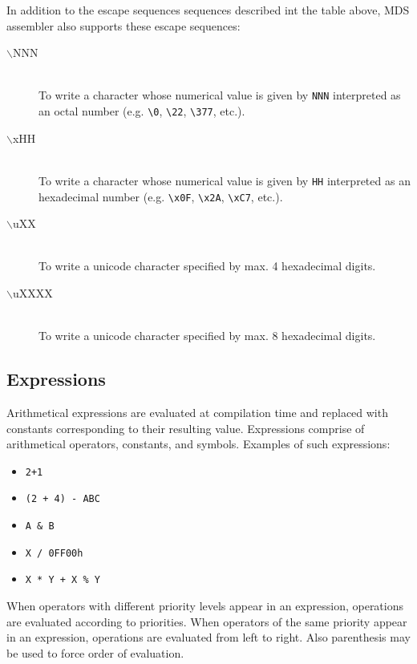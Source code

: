             In addition to the escape sequences sequences described int the table above, MDS assembler also supports these escape sequences:
            \begin{description}
                \item[$\backslash$NNN]~\\
                    To write a character whose numerical value is given by \texttt{NNN} interpreted as an octal number (e.g. \verb'\0', \verb'\22', \verb'\377', etc.).
                \item[$\backslash$xHH]~\\
                    To write a character whose numerical value is given by \texttt{HH} interpreted as an hexadecimal number (e.g. \verb'\x0F', \verb'\x2A', \verb'\xC7', etc.).
                \item[$\backslash$uXX]~\\
                    To write a unicode character specified by max. 4 hexadecimal digits.
                \item[$\backslash$uXXXX]~\\
                    To write a unicode character specified by max. 8 hexadecimal digits.
            \end{description}

    \clearpage
    \subsection{Expressions}
        Arithmetical expressions are evaluated at compilation time and replaced with constants corresponding to their resulting value. Expressions comprise of arithmetical operators, constants, and symbols. Examples of such expressions:

        \begin{itemize}
            \item \texttt{2+1}
            \item \texttt{(2 + 4) - ABC}
            \item \texttt{A \& B}
            \item \texttt{X / 0FF00h}
            \item \texttt{X * Y + X \% Y}
        \end{itemize}

        When operators with different priority levels appear in an expression, operations are evaluated according to priorities. When operators of the same priority appear in an expression, operations are evaluated from left to right. Also parenthesis may be used to force order of evaluation.

